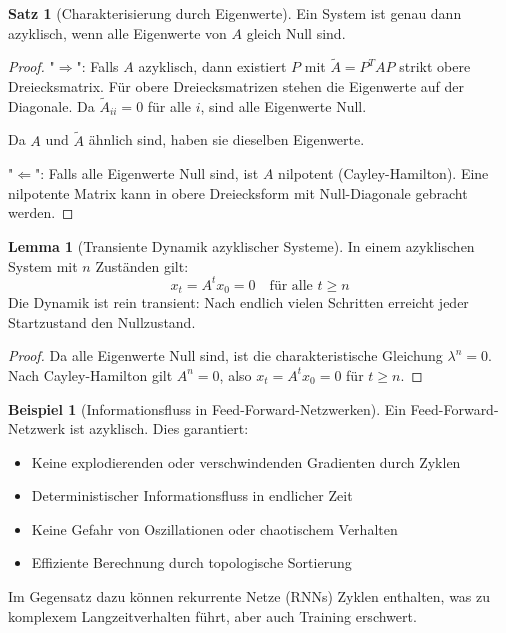 \documentclass[a4paper,12pt]{report}
\theoremstyle{definition}
\newtheorem{beispiel}{Beispiel}
\newtheorem{satz}{Satz}
\newtheorem{lemma}{Lemma}
\begin{document}
	\begin{satz}[Charakterisierung durch Eigenwerte]
		Ein System ist genau dann azyklisch, wenn alle Eigenwerte von $A$ gleich Null sind.
	\end{satz}
	
	\begin{proof}
		"$\Rightarrow$": Falls $A$ azyklisch, dann existiert $P$ mit $\tilde{A} = P^T A P$ strikt obere Dreiecksmatrix. Für obere Dreiecksmatrizen stehen die Eigenwerte auf der Diagonale. Da $\tilde{A}_{ii} = 0$ für alle $i$, sind alle Eigenwerte Null.
		
		Da $A$ und $\tilde{A}$ ähnlich sind, haben sie dieselben Eigenwerte.
		
		"$\Leftarrow$": Falls alle Eigenwerte Null sind, ist $A$ nilpotent (Cayley-Hamilton). Eine nilpotente Matrix kann in obere Dreiecksform mit Null-Diagonale gebracht werden.
	\end{proof}
	
	\begin{lemma}[Transiente Dynamik azyklischer Systeme]
		In einem azyklischen System mit $n$ Zuständen gilt:
		\[
		x_t = A^t x_0 = 0 \quad \text{für alle } t \geq n
		\]
		Die Dynamik ist rein transient: Nach endlich vielen Schritten erreicht jeder Startzustand den Nullzustand.
	\end{lemma}
	
	\begin{proof}
		Da alle Eigenwerte Null sind, ist die charakteristische Gleichung $\lambda^n = 0$. Nach Cayley-Hamilton gilt $A^n = 0$, also $x_t = A^t x_0 = 0$ für $t \geq n$.
	\end{proof}
	
	\begin{beispiel}[Informationsfluss in Feed-Forward-Netzwerken]
		Ein Feed-Forward-Netzwerk ist azyklisch. Dies garantiert:
		\begin{itemize}
			\item Keine explodierenden oder verschwindenden Gradienten durch Zyklen
			\item Deterministischer Informationsfluss in endlicher Zeit
			\item Keine Gefahr von Oszillationen oder chaotischem Verhalten
			\item Effiziente Berechnung durch topologische Sortierung
		\end{itemize}
		
		Im Gegensatz dazu können rekurrente Netze (RNNs) Zyklen enthalten, was zu komplexem Langzeitverhalten führt, aber auch Training erschwert.
	\end{beispiel}
	
\end{document}

